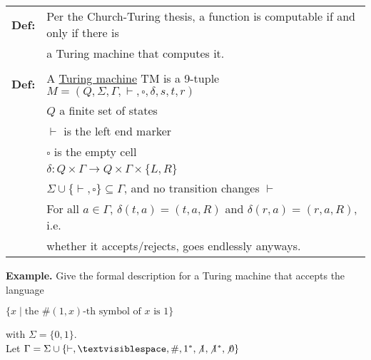 \documentclass[11pt]{article}
\begin{document}
\begin{tabular}{ll}
{\bf Def:} & Per the Church-Turing thesis, a function is computable if and only if there is \\
& a Turing machine that computes it. \\
\\
{\bf Def:} & A \underline{Turing machine} TM is a 9-tuple $M=(Q,\Sigma,\Gamma,\vdash,\square,\delta,s,t,r)$ \\
& $Q$ a finite set of states \\
& $\vdash$ is the left end marker \\
& $\square$ is the empty cell \\
& $\delta : Q \times \Gamma \rightarrow Q \times \Gamma \times \{L,R\}$ \\
& $\Sigma \cup \{\vdash,\square\} \subseteq \Gamma$, and no transition changes $\vdash$ \\
& For all $a\in\Gamma$, $\delta(t,a) = (t,a,R)$ and $\delta(r,a) = (r,a,R)$, i.e. \\
& whether it accepts/rejects, goes endlessly anyways. \\
\end{tabular}

{\bf Example.} Give the formal description for a Turing machine that accepts the language
\begin{center}
    $\{x\mid  \text{the } \#(1,x) \text{-th symbol of }x \text{ is 1}\}$
\end{center}
with $\Sigma=\{0,1\}$.\\

Let $\Gamma = \Sigma \cup \{\vdash, \textvisiblespace,\#,1^*,\not{1},\not{1^*},\not{0}\}$ \\
\end{document}
